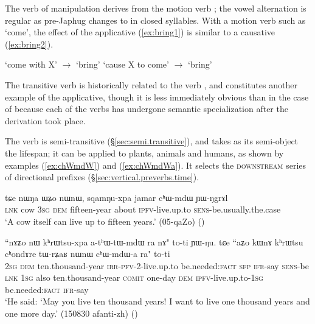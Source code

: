 The verb of manipulation  derives from the motion verb ; the vowel alternation is regular as pre-Japhug  changes to  in closed syllables. With a motion verb such as `come', the effect of the applicative (\ref{ex:bring1}) is similar to a causative  (\ref{ex:bring2}). 

\begin{exe}
\ex \label{ex:bring1}
\glt `come with X' $\rightarrow$ `bring'
\ex \label{ex:bring2}
\glt `cause X to come' $\rightarrow$ `bring'
\end{exe}

The transitive verb  is historically related to the verb , and constitutes another example of the  applicative, though it is less immediately obvious than in the case of  because each of the verbs has undergone semantic specialization after the derivation took place.

The verb  is semi-transitive (§\ref{sec:semi.transitive}), and takes as its semi-object the lifespan; it can be applied to plants, animals and humans, as shown by examples (\ref{ex:chWmdW}) and (\ref{ex:chWmdWa}). It selects the \textsc{downstream} series of directional prefixes (§\ref{sec:vertical.preverbs.time}).

 \begin{exe}
\ex \label{ex:chWmdW}
\gll tɕe nɯŋa ɯʑo nɯnɯ, sqamŋu-xpa jamar cʰɯ-mdɯ ɲɯ-ŋgrɤl\\
\textsc{lnk} cow \textsc{3sg} \textsc{dem} fifteen-year about \textsc{ipfv}-live.up.to \textsc{sens}-be.usually.the.case \\
\glt `A cow itself can live up to fifteen years.' (05-qaZo)
()
\end{exe}

 \begin{exe}
\ex \label{ex:chWmdWa}
\gll ``nɤʑo nɯ kʰrɯtsu-xpa a-tʰɯ-tɯ-mdɯ ra nɤ" to-ti ɲɯ-ŋu. tɕe ``aʑo kɯnɤ kʰrɯtsu cʰondɤre tɯ-rʑaʁ nɯnɯ cʰɯ-mdɯ-a ra" to-ti \\
\textsc{2sg} \textsc{dem} ten.thousand-year \textsc{irr}-\textsc{pfv}-2-live.up.to be.needed:\textsc{fact} \textsc{sfp} \textsc{ifr}-say \textsc{sens}-be \textsc{lnk} \textsc{1sg} also  ten.thousand-year \textsc{comit} one-day \textsc{dem} \textsc{ipfv}-live.up.to-\textsc{1sg} be.needed:\textsc{fact} \textsc{ifr}-say \\
\glt `He said: `May you live ten thousand years! I want to live one thousand years and one more day.' (150830 afanti-zh)
()
\end{exe}

